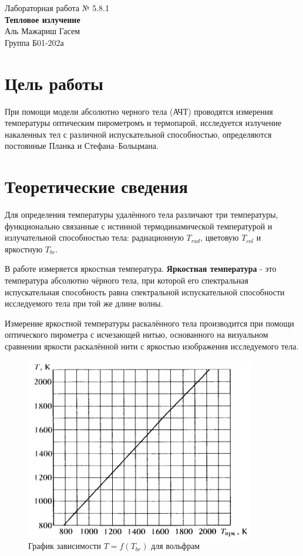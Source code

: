 \documentclass[a4paper,12pt]{article} %
\begin{document}
\begin{center}   
	\large{Лабораторная работа № 5.8.1\\\large{\textbf{Тепловое излучение}}}\\
		Аль Мажариш Гасем\\
		Группа Б01-202а
\end{center}

\thispagestyle{empty}

\section * {Цель работы}

При помощи модели абсолютно черного тела (АЧТ) проводятся измерения температуры оптическим пирометромъ и термопарой, исследуется излучение накаленных тел с различной испускательной способностью, определяются постоянные Планка и Стефана–Больцмана.

\section * {Теоретические сведения}

Для определения температуры удалённого тела различают три температуры, функционально связанные с истинной термодинамической температурой и излучательной способностью тела: радиационную $T_{rad}$, цветовую $T_{col}$ и яркостную $T_{br}$. \par

В работе измеряется яркостная температура. \textbf{Яркостная температура} - это температура абсолютно чёрного тела, при которой его спектральная испускательная способность равна спектральной испускательной способности исследуемого тела при той же длине волны.

Измерение яркостной температуры раскалённого тела производится при помощи оптического пирометра с исчезающей нитью, основанного на визуальном сравнении яркости раскалённой нити с яркостью изображения исследуемого тела. \par

\begin{figure}[h!]
    \centering
    \includegraphics[width=10cm]{fig2.PNG}
    \caption{График зависимости $T = f(T_{br})$ для вольфрам}
    \label{fig:vac}
\end{figure}
\end{document}
